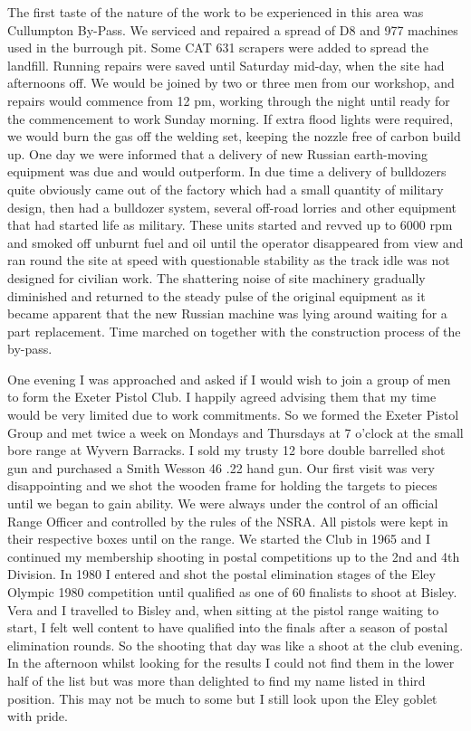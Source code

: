 The first taste of the nature of the work to be experienced in this area was
Cullumpton By-Pass. We serviced and repaired a spread of D8 and 977 machines
used in the burrough pit. Some CAT 631 scrapers were added to spread the
landfill. Running repairs were saved until Saturday mid-day, when the site had
afternoons off. We would be joined by two or three men from our workshop, and
repairs would commence from 12 pm, working through the night until ready for
the commencement to work Sunday morning. If extra flood lights were required,
we would burn the gas off the welding set, keeping the nozzle free of carbon
build up. One day we were informed that a delivery of new Russian earth-moving
equipment was due and would outperform. In due time a delivery of bulldozers
quite obviously came out of the factory which had a small quantity of military
design, then had a bulldozer system, several off-road lorries and other
equipment that had started life as military. These units started and revved up
to 6000 rpm and smoked off unburnt fuel and oil until the operator disappeared
from view and ran round the site at speed with questionable stability as the
track idle was not designed for civilian work. The shattering noise of site
machinery gradually diminished and returned to the steady pulse of the original
equipment as it became apparent that the new Russian machine was lying around
waiting for a part replacement. Time marched on together with the construction
process of the by-pass.

One evening I was approached and asked if I would wish to join a group of men to
form the Exeter Pistol Club. I happily agreed advising them that my time would
be very limited due to work commitments. So we formed the Exeter Pistol Group
and met twice a week on Mondays and Thursdays at 7 o'clock at the small bore
range at Wyvern Barracks. I sold my trusty 12 bore double barrelled shot gun
and purchased a Smith Wesson 46 .22 hand gun. Our first visit was very
disappointing and we shot the wooden frame for holding the targets to pieces
until we began to gain ability. We were always under the control of an official
Range Officer and controlled by the rules of the NSRA. All pistols were kept in
their respective boxes until on the range. We started the Club in 1965 and I
continued my membership shooting in postal competitions up to the 2nd and 4th
Division. In 1980 I entered and shot the postal elimination stages of the Eley
Olympic 1980 competition until qualified as one of 60 finalists to shoot at
Bisley. Vera and I travelled to Bisley and, when sitting at the pistol range
waiting to start, I felt well content to have qualified into the finals after a
season of postal elimination rounds. So the shooting that day was like a shoot
at the club evening. In the afternoon whilst looking for the results I could
not find them in the lower half of the list but was more than delighted to find
my name listed in third position. This may not be much to some but I still look
upon the Eley goblet with pride.

